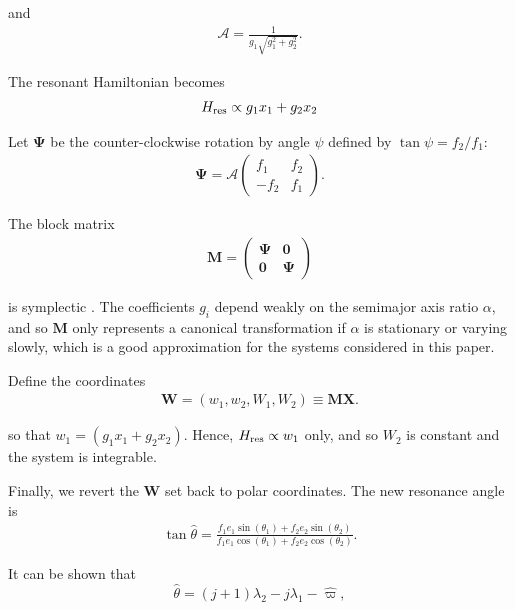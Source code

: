 \documentclass[usenatbib]{mnras}
\renewcommand{\v}[1]{\boldsymbol{ #1 }}
\begin{document}
\noindent and
\begin{align}
  \mathcal{A} = \frac{1}{g_1\sqrt{g_1^2+g_2^2}}.
\end{align}

\noindent The resonant Hamiltonian becomes
\begin{align}
  H_{\rm res} \propto g_1 x_1 + g_2 x_2
\end{align}

Let \(\v \Psi\) be the
counter-clockwise rotation by angle \(\psi\) defined by \(\tan\psi=
f_2/f_1\):
\begin{align}
  \v \Psi =  \mathcal{A}
  \begin{pmatrix}
    f_1 & f_2 \\
    -f_2 & f_1 
  \end{pmatrix}.
\end{align}

\noindent The block matrix
\begin{align}
  \v M =
  \begin{pmatrix}
    \v \Psi & \v 0 \\
    \v 0 & \v \Psi
  \end{pmatrix}
\end{align}

\noindent is symplectic \cite{goldstein_classical_2000}.  The
coefficients \(g_i\) depend weakly on the semimajor axis ratio \(\alpha\),
and so \(\v M\) only represents a canonical transformation if \(\alpha\)
is stationary or varying slowly, which is a good approximation for the
systems considered in this paper.

Define the coordinates
\begin{align}
   \v W = (w_1, w_2, W_1, W_2) \equiv \v M \v X.
\end{align}

\noindent so that \(w_1 = (g_1 x_1 + g_2 x_2)\).
Hence, \(H_{\rm res}\propto w_1\) only, and so \(W_2\) is
constant and the system is integrable.

Finally, we revert the \(\v W\) set back to polar coordinates. The new
resonance angle is
\begin{align}
\label{hattheta}
  \tan\hat{\theta} = \frac{f_1 e_1\sin(\theta_1)
  + f_2e_2\sin(\theta_2)}{f_1e_1\cos(\theta_1) + f_2e_2\cos(\theta_2)}.
\end{align}

\noindent
It can be shown that
\begin{equation}
  \hat{\theta} = (j+1)\lambda_2-j\lambda_1
  - \hat\varpi,
\end{equation}
\end{document}

